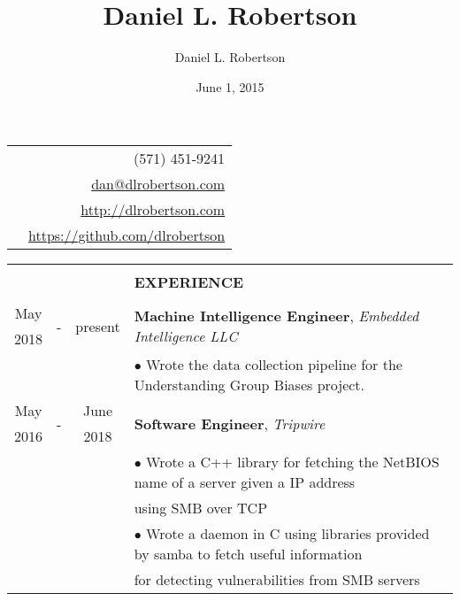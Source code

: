 \documentclass[10pt]{article}
\title{Daniel L. Robertson}
\date{June 1, 2015}
\author{Daniel L. Robertson}
\begin{document}
    \normalfont
    \begin{table}[ht]
        \begin{tabular}{p{13cm}r}
            \multirow{4}{*}{\hspace*{1cm}\color{maroon}{\huge\textbf{Daniel L. Robertson}}} & (571) 451-9241\\
            & \href{mailto:dan@dlrobertson.com}{dan@dlrobertson.com}\\
            & \href{http://dlrobertson.com}{http://dlrobertson.com}\\
            & \href{https://github.com/dlrobertson}{https://github.com/dlrobertson}\\
        \end{tabular}
        \begin{tabular}{@{\hspace{0mm}}c@{\hspace{1mm}}c@{\hspace{3mm}}cl}
            & & & \color{maroon}{\rule{14cm}{0.75pt}}\\
            & & & \large{\textbf{EXPERIENCE}}\\[-2mm]
            & & & \color{maroon}{\rule{14cm}{0.75pt}}\\
            May & \multirow{2}{*}{-} & \multirow{2}{*}{present} & \multirow{2}{*}{\textbf{Machine Intelligence Engineer}, \textit{Embedded Intelligence LLC}}\\
            2018 & & &\\
            & & & $\bullet$ Wrote the data collection pipeline for the Understanding Group Biases project.\\
            May & \multirow{2}{*}{-} & June & \multirow{2}{*}{\textbf{Software Engineer}, \textit{Tripwire}}\\
            2016 & & 2018 &\\
            & & & $\bullet$ Wrote a C++ library for fetching the NetBIOS name of a server given a IP address\\
            & & & \hspace*{4mm}using SMB over TCP\\
            & & & $\bullet$ Wrote a daemon in C using libraries provided by samba to fetch useful information\\
            & & & \hspace*{4mm}for detecting vulnerabilities from SMB servers\\

\end{tabular}
\end{table}
\end{document}

